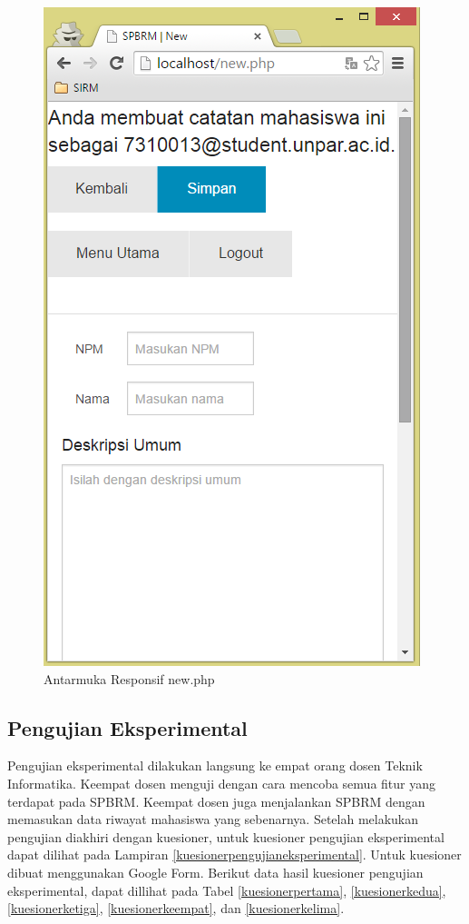 \begin{figure}[H]
\centering
\includegraphics[scale=0.44]{Gambar/pengujian24.png}
\caption[Antarmuka Responsif new.php]{Antarmuka Responsif new.php} 
\label{fig:responsifnew}
\end{figure}

\subsection{Pengujian Eksperimental}
\label{sec:pengujianeksperimantal}

Pengujian eksperimental dilakukan langsung ke empat orang dosen Teknik Informatika. Keempat dosen menguji dengan cara mencoba semua fitur yang terdapat pada SPBRM. Keempat dosen juga menjalankan SPBRM dengan memasukan data riwayat mahasiswa yang sebenarnya. Setelah melakukan pengujian diakhiri dengan kuesioner, untuk kuesioner pengujian eksperimental dapat dilihat pada Lampiran \ref{kuesionerpengujianeksperimental}. Untuk kuesioner dibuat menggunakan Google Form. Berikut data hasil kuesioner pengujian eksperimental, dapat dillihat pada Tabel \ref{kuesionerpertama}, \ref{kuesionerkedua}, \ref{kuesionerketiga}, \ref{kuesionerkeempat}, dan \ref{kuesionerkelima}.

